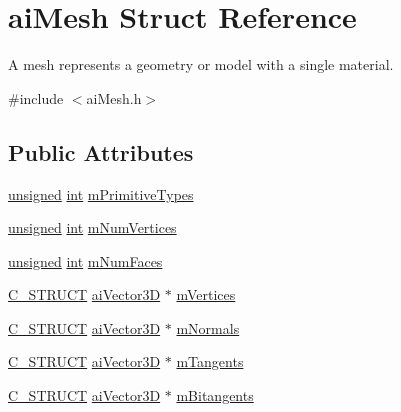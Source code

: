 \hypertarget{structai_mesh}{\section{ai\-Mesh Struct Reference}
\label{structai_mesh}
}


A mesh represents a geometry or model with a single material.  




{\ttfamily \#include $<$ai\-Mesh.\-h$>$}

\subsection*{Public Attributes}
\begin{DoxyCompactItemize}
\item 
\hyperlink{_free_image_8h_a425076c7067a1b5166e2cc530e914814}{unsigned} \hyperlink{wglew_8h_a500a82aecba06f4550f6849b8099ca21}{int} \hyperlink{structai_mesh_a99d66ac0a444068c1b252b30265cbf53}{m\-Primitive\-Types}
\item 
\hyperlink{_free_image_8h_a425076c7067a1b5166e2cc530e914814}{unsigned} \hyperlink{wglew_8h_a500a82aecba06f4550f6849b8099ca21}{int} \hyperlink{structai_mesh_ab34b7b5941e6636f1c08f615cbb072ef}{m\-Num\-Vertices}
\item 
\hyperlink{_free_image_8h_a425076c7067a1b5166e2cc530e914814}{unsigned} \hyperlink{wglew_8h_a500a82aecba06f4550f6849b8099ca21}{int} \hyperlink{structai_mesh_aeed22ee6963b79548f3877b3c905518e}{m\-Num\-Faces}
\item 
\hyperlink{ai_defines_8h_ab51df4230ceb602bbc1bc109c432a6a0}{C\-\_\-\-S\-T\-R\-U\-C\-T} \hyperlink{structai_vector3_d}{ai\-Vector3\-D} $\ast$ \hyperlink{structai_mesh_afd4588abb3e1c72821ae0234a3850662}{m\-Vertices}
\item 
\hyperlink{ai_defines_8h_ab51df4230ceb602bbc1bc109c432a6a0}{C\-\_\-\-S\-T\-R\-U\-C\-T} \hyperlink{structai_vector3_d}{ai\-Vector3\-D} $\ast$ \hyperlink{structai_mesh_aec81b496b4d93838cef038933dabe9b9}{m\-Normals}
\item 
\hyperlink{ai_defines_8h_ab51df4230ceb602bbc1bc109c432a6a0}{C\-\_\-\-S\-T\-R\-U\-C\-T} \hyperlink{structai_vector3_d}{ai\-Vector3\-D} $\ast$ \hyperlink{structai_mesh_af367ff78bd69f3e83d7edc8ad67dc5df}{m\-Tangents}
\item 
\hyperlink{ai_defines_8h_ab51df4230ceb602bbc1bc109c432a6a0}{C\-\_\-\-S\-T\-R\-U\-C\-T} \hyperlink{structai_vector3_d}{ai\-Vector3\-D} $\ast$ \hyperlink{structai_mesh_ab2a81bfe1731f01271ebab274a8f01c4}{m\-Bitangents}

\end{DoxyCompactItemize}
